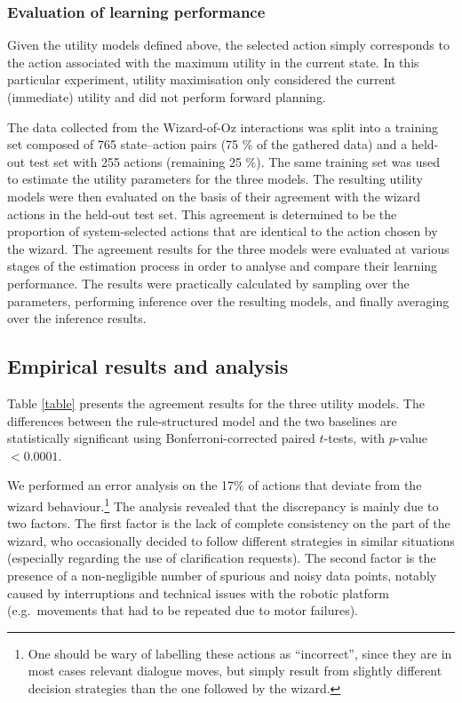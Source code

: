 
\subsubsection*{Evaluation of learning performance}
Given the utility models defined above, the selected action simply corresponds to the action associated with the maximum utility in the current state. In this particular experiment, utility maximisation only considered the current (immediate) utility and did not perform forward planning.

The data collected from the Wizard-of-Oz interactions was split into a training set composed of 765 state--action pairs (75 \% of the gathered data) and a held-out test set with 255 actions (remaining 25 \%). The same training set was used to estimate the utility parameters for the three models.  The resulting utility models were then evaluated on the basis of their agreement with the wizard actions in the held-out test set. This agreement is determined to be the proportion of system-selected actions that are identical to the action chosen by the wizard. The agreement results for the three models were evaluated at various stages of the estimation process in order to analyse and compare their learning performance. The results were practically calculated by sampling over the parameters, performing inference over the resulting models, and finally averaging over the inference results.  

\subsection{Empirical results and analysis}
\label{sec:wozlearning-experiments-results}

Table \ref{table} presents the agreement results for the three utility models. The differences between the rule-structured model and the two baselines are statistically significant using Bonferroni-corrected paired $t$-tests, with $p$-value $< 0.0001$.   

We performed an error analysis on the 17\% of actions that deviate from the wizard behaviour.\footnote{One should be wary of labelling these actions as ``incorrect'', since they are in most cases relevant dialogue moves, but simply result from slightly different decision strategies than the one followed by the wizard.} The analysis revealed that the discrepancy is mainly due to two factors.  The first factor is the lack of complete consistency on the part of the wizard, who occasionally decided to follow different strategies in similar situations (especially regarding the use of clarification requests). The second factor is the presence of a non-negligible number of spurious and noisy data points, notably caused by interruptions and technical issues with the robotic platform (e.g.\ movements that had to be repeated due to motor failures).


